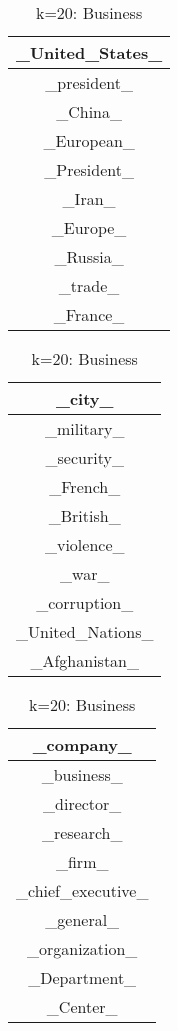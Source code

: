 \documentclass{article}
\begin{document}
\begin{table}[ht]
    \parbox{.25\linewidth}{
    \centering
    \begin{tabular}{|c|}
    \hline
    \_United\_States\_\\
    \hline
    \_president\_\\
    \hline
    \_China\_\\
    \hline
    \_European\_\\
    \hline
    \_President\_\\
    \hline
    \_Iran\_\\
    \hline
    \_Europe\_\\
    \hline
    \_Russia\_\\
    \hline
    \_trade\_\\
    \hline
    \_France\_\\
    \hline
    \end{tabular}
    \caption{k=20: U.S Government/Foreign Entities}
    }
    \hfill
    \parbox{.25\linewidth}{
    \centering
    \begin{tabular}{|c|}
    \hline
    \_city\_\\
    \hline
    \_military\_\\
    \hline
    \_security\_\\
    \hline
    \_French\_\\
    \hline
    \_British\_\\
    \hline
    \_violence\_\\
    \hline
    \_war\_\\
    \hline
    \_corruption\_\\
    \hline
    \_United\_Nations\_\\
    \hline
    \_Afghanistan\_\\
    \hline
    \end{tabular}
    \caption{k=20: Military/War}
    }
    \hfill
    \parbox{.25\linewidth}{
    \centering
    \begin{tabular}{|c|}
    \hline
    \_company\_\\
    \hline
    \_business\_\\
    \hline
    \_director\_\\
    \hline
    \_research\_\\
    \hline
    \_firm\_\\
    \hline
    \_chief\_executive\_\\
    \hline
    \_general\_\\
    \hline
    \_organization\_\\
    \hline
    \_Department\_\\
    \hline
    \_Center\_\\
    \hline
    \end{tabular}
    \caption{k=20: Business}
    }
\end{table}\\
\end{document}
